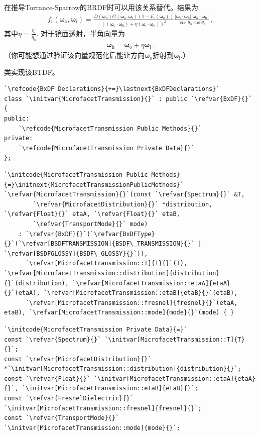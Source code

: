 在推导Torrance-Sparrow的BRDF时可以用该关系替代。结果为
\begin{align}\label{eq:8.19}
    f_{\mathrm{r}}({\bm\omega}_{\mathrm{o}},{\bm\omega}_{\mathrm{i}})=
    \frac{D({\bm\omega}_{\mathrm{h}})G({\bm\omega}_{\mathrm{o}},{\bm\omega}_{\mathrm{i}})
    (1-F_{\mathrm{r}}({\bm\omega}_{\mathrm{o}}))}{(({\bm\omega}_{\mathrm{o}}\cdot{\bm\omega}_{\mathrm{h}})
    +\eta({\bm\omega}_{\mathrm{i}}\cdot{\bm\omega}_{\mathrm{h}}))^2}
    \frac{|{\bm\omega}_{\mathrm{i}}\cdot{\bm\omega}_{\mathrm{h}}|
    |{\bm\omega}_{\mathrm{o}}\cdot{\bm\omega}_{\mathrm{h}}|}
    {\cos\theta_{\mathrm{o}}\cos\theta_{\mathrm{i}}}\, ,
\end{align}
其中$\displaystyle\eta=\frac{\eta_{\mathrm{i}}}{\eta_{\mathrm{o}}}$.
对于镜面透射，半角向量为
\begin{align*}
    {\bm\omega}_{\mathrm{h}}={\bm\omega}_{\mathrm{o}}+\eta{\bm\omega}_{\mathrm{i}}\, .
\end{align*}
（你可能想通过验证该向量规范化后能让方向${\bm\omega}_{\mathrm{o}}$折射到${\bm\omega}_{\mathrm{i}}$.）

类实现该BTDF。
\begin{lstlisting}
`\refcode{BxDF Declarations}{+=}\lastnext{BxDFDeclarations}`
class `\initvar{MicrofacetTransmission}{}` : public `\refvar{BxDF}{}` {
public:
    `\refcode{MicrofacetTransmission Public Methods}{}`
private:
    `\refcode{MicrofacetTransmission Private Data}{}`
};
\end{lstlisting}
\begin{lstlisting}
`\initcode{MicrofacetTransmission Public Methods}{=}\initnext{MicrofacetTransmissionPublicMethods}`
`\refvar{MicrofacetTransmission}{}`(const `\refvar{Spectrum}{}` &T,
        `\refvar{MicrofacetDistribution}{}` *distribution, `\refvar{Float}{}` etaA, `\refvar{Float}{}` etaB,
        `\refvar{TransportMode}{}` mode)
    : `\refvar{BxDF}{}`(`\refvar{BxDFType}{}`(`\refvar[BSDFTRANSMISSION]{BSDF\_TRANSMISSION}{}` | `\refvar[BSDFGLOSSY]{BSDF\_GLOSSY}{}`)),
      `\refvar[MicrofacetTransmission::T]{T}{}`(T), `\refvar[MicrofacetTransmission::distribution]{distribution}{}`(distribution), `\refvar[MicrofacetTransmission::etaA]{etaA}{}`(etaA), `\refvar[MicrofacetTransmission::etaB]{etaB}{}`(etaB),
      `\refvar[MicrofacetTransmission::fresnel]{fresnel}{}`(etaA, etaB), `\refvar[MicrofacetTransmission::mode]{mode}{}`(mode) { }
\end{lstlisting}
\begin{lstlisting}
`\initcode{MicrofacetTransmission Private Data}{=}`
const `\refvar{Spectrum}{}` `\initvar[MicrofacetTransmission::T]{T}{}`;
const `\refvar{MicrofacetDistribution}{}` *`\initvar[MicrofacetTransmission::distribution]{distribution}{}`;
const `\refvar{Float}{}` `\initvar[MicrofacetTransmission::etaA]{etaA}{}`, `\initvar[MicrofacetTransmission::etaB]{etaB}{}`;
const `\refvar{FresnelDielectric}{}` `\initvar[MicrofacetTransmission::fresnel]{fresnel}{}`;
const `\refvar{TransportMode}{}` `\initvar[MicrofacetTransmission::mode]{mode}{}`;
\end{lstlisting}

